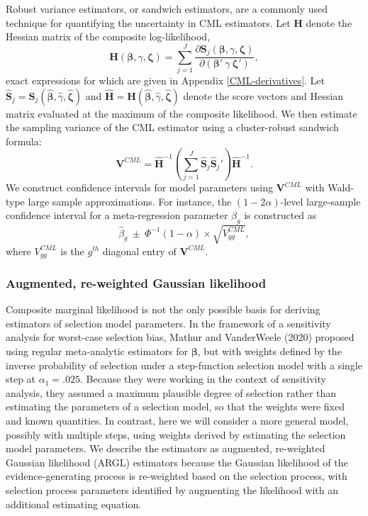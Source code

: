 \documentclass[
  american,
  man, donotrepeattitle,floatsintext]{apa7}
\begin{document}
Robust variance estimators, or sandwich estimators, are a commonly used technique for quantifying the uncertainty in CML estimators. Let \(\mathbf{H}\) denote the Hessian matrix of the composite log-likelihood,
\begin{equation}
\mathbf{H}(\boldsymbol\beta, \gamma, \boldsymbol\zeta) = \sum_{j=1}^J \frac{\partial \mathbf{S}_j(\boldsymbol\beta, \gamma, \boldsymbol\zeta)}{\partial \left(\boldsymbol\beta' \ \gamma \ \boldsymbol\zeta'\right)},
\end{equation}
exact expressions for which are given in Appendix \ref{CML-derivatives}.
Let \(\mathbf{\hat{S}}_j = \mathbf{S}_j(\boldsymbol{\hat\beta}, \hat\gamma, \boldsymbol{\hat\zeta})\) and \(\mathbf{\hat{H}} = \mathbf{H}(\boldsymbol{\hat\beta}, \hat\gamma, \boldsymbol{\hat\zeta})\) denote the score vectors and Hessian matrix evaluated at the maximum of the composite likelihood.
We then estimate the sampling variance of the CML estimator using a cluster-robust sandwich formula:
\begin{equation}
\label{eq:sandwich-variance}
\mathbf{V}^{CML} = \mathbf{\hat{H}}^{-1}\left(\sum_{j=1}^J \mathbf{\hat{S}}_j {\mathbf{\hat{S}}_j}'\right) \mathbf{\hat{H}}^{-1}.
\end{equation}
We construct confidence intervals for model parameters using \(\mathbf{V}^{CML}\) with Wald-type large sample approximations. For instance, the \((1 - 2\alpha)\)-level large-sample confidence interval for a meta-regression parameter \(\beta_g\) is constructed as
\[
\hat\beta_g \ \pm \ \Phi^{-1}(1 - \alpha) \times \sqrt{V^{CML}_{gg}},
\]
where \(V^{CML}_{gg}\) is the \(g^{th}\) diagonal entry of \(\mathbf{V}^{CML}\).

\subsubsection{Augmented, re-weighted Gaussian likelihood}\label{augmented-re-weighted-gaussian-likelihood}

Composite marginal likelihood is not the only possible basis for deriving estimators of selection model parameters.
In the framework of a sensitivity analysis for worst-case selection bias, Mathur and VanderWeele (2020) proposed using regular meta-analytic estimators for \(\boldsymbol\beta\), but with weights defined by the inverse probability of selection under a step-function selection model with a single step at \(\alpha_1 = .025\).
Because they were working in the context of sensitivity analysis, they assumed a maximum plausible degree of selection rather than estimating the parameters of a selection model, so that the weights were fixed and known quantities.
In contrast, here we will consider a more general model, possibly with multiple steps, using weights derived by estimating the selection model parameters.
We describe the estimators as augmented, re-weighted Gaussian likelihood (ARGL) estimators because the Gaussian likelihood of the evidence-generating process is re-weighted based on the selection process, with selection process parameters identified by augmenting the likelihood with an additional estimating equation.
\end{document}
